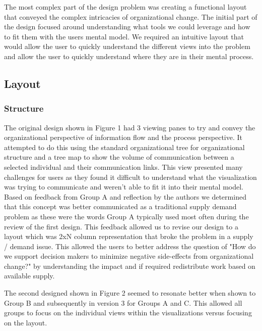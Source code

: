\documentclass[journal]{vgtc}                %
\begin{document}
The most complex part of the design problem was creating a functional layout that conveyed the complex intricacies of organizational change.  The initial part of the design focused around understanding what tools we could leverage and how to fit them with the users mental model.  We required an intuitive layout that would allow the user to quickly understand the different views into the problem and allow the user to quickly understand where they are in their mental process.

\subsection{Layout}
\subsubsection{Structure}
The original design shown in Figure 1 had 3 viewing panes to try and convey the organizational perspective of information flow and the process perspective.  It attempted to do this using the standard organizational tree for organizational structure and a tree map to show the volume of communication between a selected individual and their communication links.  This view presented many challenges for users as they found it difficult to understand what the visualization was trying to communicate and weren't able to fit it into their mental model.  Based on feedback from Group A and reflection by the authors we determined that this concept was better communicated as a traditional supply demand problem as these were the words Group A typically used most often during the review of the first design.  This feedback allowed us to revise our design to a layout which was 2xN column representation that broke the problem in a supply / demand issue.  This allowed the users to better address the question of "How do we support decision makers to minimize negative side-effects from organizational change?" by understanding the impact and if required redistribute work based on available supply.


The second designed shown in Figure 2 seemed to resonate better when shown to Group B and subsequently in version 3 for Groups A and C.  This allowed all groups to focus on the individual views within the visualizations versus focusing on the layout.
\end{document}
